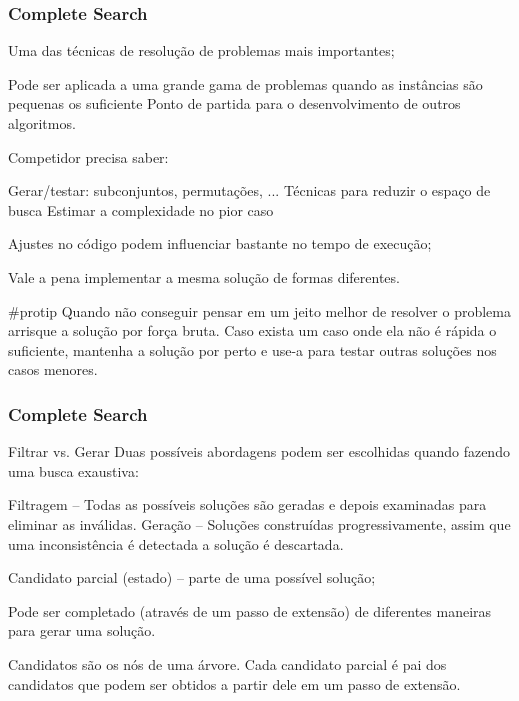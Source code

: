 \begin{frame}
\frametitle{Complete Search}

\begin{block}{}
\begin{itemize}
	\bitem Uma das técnicas de resolução de problemas mais importantes;
	\begin{itemize}
		\bitem Pode ser aplicada a uma grande gama de problemas quando as instâncias são pequenas os suficiente
		\bitem Ponto de partida para o desenvolvimento de outros algoritmos.
	\end{itemize}
	\bitem Competidor precisa saber:
	\begin{itemize}
		\bitem Gerar/testar: subconjuntos, permutações, ...
		\bitem Técnicas para reduzir o espaço de busca
		\bitem Estimar a complexidade no pior caso
	\end{itemize}
	\bitem Ajustes no código podem influenciar bastante no tempo de execução;
	\begin{itemize}
		\bitem Vale a pena implementar a mesma solução de formas diferentes.
	\end{itemize}
\end{itemize}	
\end{block}

\begin{block}{\tiny \#protip}
Quando não conseguir pensar em um jeito melhor de resolver o problema arrisque a solução por força bruta.
Caso exista um caso onde ela não é rápida o suficiente, mantenha a solução por perto e use-a para testar outras soluções nos casos menores.
\end{block}
\end{frame}

\begin{frame}
\frametitle{Complete Search}
\begin{block}{Filtrar vs. Gerar }
Duas possíveis abordagens podem ser escolhidas quando fazendo uma busca exaustiva:
\begin{itemize}
	\bitem Filtragem -- Todas as possíveis soluções são geradas e depois examinadas para eliminar as inválidas.
	\bitem Geração -- Soluções construídas progressivamente, assim que uma inconsistência é detectada a solução é descartada.
\end{itemize}
\end{block}
\pause
\begin{block}{}
\begin{itemize}
	\bitem Candidato parcial (estado) -- parte de uma possível solução;
	\begin{itemize}
		\bitem Pode ser completado (através de um passo de extensão) de diferentes maneiras para gerar uma solução.
	\end{itemize}	
	\bitem Candidatos são os nós de uma árvore. Cada candidato parcial é pai dos candidatos que podem ser obtidos a partir dele em um passo de extensão.
\end{itemize}
\end{block}
\end{frame}

